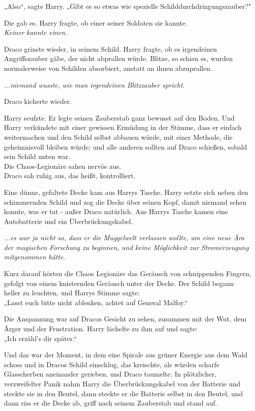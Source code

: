 {„Also“, sagte Harry. „Gibt es so etwas wie spezielle Schilddurchdringungszauber?"

Die gab es. Harry fragte, ob einer seiner Soldaten sie kannte.\\ \emph{Keiner kannte einen.}

Draco grinste wieder, in seinem Schild. Harry fragte, ob es irgendeinen Angriffszauber gäbe, der nicht abprallen würde. Blitze, so schien es, wurden normalerweise von Schilden absorbiert, anstatt an ihnen abzuprallen.

\emph{...niemand wusste, wie man irgendeinen Blitzzauber spricht}.

Draco kicherte wieder.

Harry seufzte. Er legte seinen Zauberstab ganz bewusst auf den Boden. Und Harry verkündete mit einer gewissen Ermüdung in der Stimme, dass er einfach weitermachen und den Schild selbst abbauen würde, mit einer Methode, die geheimnisvoll bleiben würde; und alle anderen sollten auf Draco schießen, sobald sein Schild unten war.\\ Die Chaos-Legionäre sahen nervös aus.\\ Draco sah ruhig aus, das heißt, kontrolliert.

Eine dünne, gefaltete Decke kam aus Harrys Tasche. Harry setzte sich neben den schimmernden Schild und zog die Decke über seinen Kopf, damit niemand sehen konnte, was er tat - außer Draco natürlich. Aus Harrys Tasche kamen eine Autobatterie und ein Überbrückungskabel.

\emph{...es war ja nicht so, dass er die Muggelwelt verlassen wollte, um eine neue Ära der magischen Forschung zu beginnen, und keine Möglichkeit zur Stromerzeugung mitgenommen hätte.}

Kurz darauf hörten die Chaos Legionäre das Geräusch von schnippenden Fingern, gefolgt von einem knisternden Geräusch unter der Decke. Der Schild begann heller zu leuchten, und Harrys Stimme sagte:\\ „Lasst euch bitte nicht ablenken, achtet auf General Malfoy.“

Die Anspannung war auf Dracos Gesicht zu sehen, zusammen mit der Wut, dem Ärger und der Frustration. Harry lächelte zu ihm auf und sagte:\\ „Ich erzähl's dir später.“

Und das war der Moment, in dem eine Spirale aus grüner Energie aus dem Wald schoss und in Dracos Schild einschlug, das kreischte, als würden scharfe Glasscherben aneinander gerieben, und Draco taumelte. In plötzlicher, verzweifelter Panik nahm Harry die Überbrückungskabel von der Batterie und steckte sie in den Beutel, dann steckte er die Batterie selbst in den Beutel, und dann riss er die Decke ab, griff nach seinem Zauberstab und stand auf.

}
